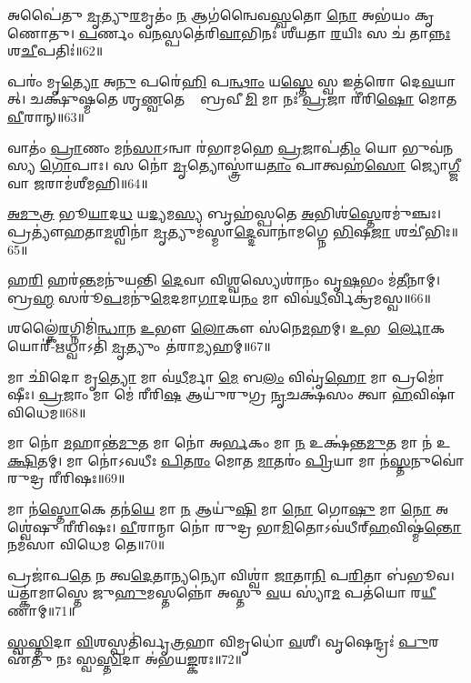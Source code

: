 
𑌅𑌪𑍈॑𑌤𑍁 \ul{𑌮𑍃}𑌤𑍍𑌯𑍁\ul{𑌰}𑌮𑍃𑌤𑌂॑ \ul{𑌨} 𑌆𑌗॑𑌨𑍍𑌵𑍈𑌵\ul{𑌸𑍍𑌵}𑌤𑍋 \ul{𑌨𑍋} 𑌅𑌭॑𑌯𑌂 𑌕𑍃𑌣𑍋𑌤𑍁। 
\ul{𑌪}𑌰𑍍𑌣𑌂 𑌵\ul{𑌨}𑌸𑍍𑌪𑌤𑍇॑𑌰𑌿\ul{𑌵𑌾}𑌭𑌿𑌨𑌃॑ 𑌶𑍀𑌯𑌤𑌾 \ul{𑌰}𑌯𑌿𑌃 𑌸 𑌚॑ 𑌤𑌾\ul{𑌨𑍍𑌨𑌃} 𑌶\ul{𑌚𑍀}𑌪𑌤𑌿𑌃॑॥62॥%
\anuvakamend

 𑌪𑌰𑌂॑ 𑌮𑍃\ul{𑌤𑍍𑌯𑍋} 𑌅\ul{𑌨𑍁} 𑌪𑌰𑍇॑\ul{𑌹𑌿} 𑌪\ul{𑌨𑍍𑌥𑌾𑌂} 𑌯\ul{𑌸𑍍𑌤𑍇} 𑌸𑍍𑌵 𑌇𑌤॑𑌰𑍋 𑌦𑍇\ul{𑌵}𑌯𑌾𑌨𑌾᳚𑌤𑍍। 
 𑌚𑌕𑍍𑌷𑍁॑𑌷𑍍𑌮𑌤𑍇 𑌶𑍃\ul{𑌣𑍍𑌵}𑌤𑍇 𑌤𑍇᳚ 𑌬𑍍𑌰𑌵𑍀\ul{𑌮𑌿} 𑌮𑌾 𑌨𑌃॑ \ul{𑌪𑍍𑌰}𑌜𑌾 𑌰𑍀॑𑌰𑌿\ul{𑌷𑍋} 𑌮𑍋𑌤 \ul{𑌵𑍀}𑌰𑌾𑌨𑍍॥63॥
 \anuvakamend
 
 𑌵𑌾𑌤𑌂॑ \ul{𑌪𑍍𑌰𑌾}𑌣𑌂 𑌮𑌨॑\ul{𑌸𑌾}𑌽𑌨𑍍𑌵𑌾 𑌰॑𑌭𑌾𑌮𑌹𑍇 \ul{𑌪𑍍𑌰}𑌜𑌾𑌪॑\ul{𑌤𑌿𑌂} 𑌯𑍋 𑌭𑍁𑌵॑𑌨𑌸𑍍𑌯 \ul{𑌗𑍋}𑌪𑌾𑌃। 
 𑌸 𑌨𑍋॑ \ul{𑌮𑍃}𑌤𑍍𑌯𑍋𑌸𑍍𑌤𑍍𑌰𑌾॑𑌯\ul{𑌤𑌾𑌂} 𑌪𑌾𑌤𑍍𑌵𑌹॑\ul{𑌸𑍋} 𑌜𑍍𑌯𑍋\ul{𑌗𑍍𑌜𑍀}𑌵𑌾 \ul{𑌜}𑌰𑌾𑌮॑𑌶𑍀𑌮𑌹𑌿॥64॥
 \anuvakamend
 
 \ul{𑌅}\ul{𑌮𑍁}\ul{𑌤𑍍𑌰} 𑌭𑍂\ul{𑌯𑌾}𑌦\ul{𑌧} 𑌯\ul{𑌦𑍍𑌯}𑌮\ul{𑌸𑍍𑌯} 𑌬𑍃𑌹॑𑌸𑍍𑌪𑌤𑍇 \ul{𑌅}𑌭𑌿𑌶॑\ul{𑌸𑍍𑌤𑍇}𑌰𑌮𑍁॑𑌞𑍍𑌚𑌃। 
 𑌪𑍍𑌰𑌤𑍍𑌯𑍗॑𑌹𑌤𑌾\ul{𑌮}𑌶𑍍𑌵𑌿𑌨𑌾॑ \ul{𑌮𑍃}𑌤𑍍𑌯𑍁𑌮॑𑌸𑍍𑌮𑌾\ul{𑌦𑍍𑌦𑍇}𑌵𑌾𑌨𑌾॑𑌮𑌗𑍍𑌨𑍇 \ul{𑌭𑌿}𑌷\ul{𑌜𑌾} 𑌶𑌚𑍀॑𑌭𑌿𑌃॥65॥
 \anuvakamend
 
 𑌹\ul{𑌰𑌿}\ul{} 𑌹𑌰॑\ul{𑌨𑍍𑌤}𑌮𑌨𑍁॑𑌯𑌨𑍍𑌤𑌿 \ul{𑌦𑍇}𑌵𑌾 𑌵𑌿\ul{𑌶𑍍𑌵}𑌸𑍍𑌯𑍇𑌶𑌾॑𑌨𑌂 𑌵𑍃\ul{𑌷}𑌭𑌂 𑌮॑\ul{𑌤𑍀}𑌨𑌾𑌮𑍍। 
 𑌬𑍍𑌰\ul{𑌹𑍍𑌮} 𑌸𑌰𑍂॑\ul{𑌪}𑌮𑌨𑍁॑\ul{𑌮𑍇}𑌦𑌮𑌾\ul{𑌗𑌾}𑌦𑌯॑\ul{𑌨𑌂} 𑌮𑌾 𑌵𑌿𑌵॑\ul{𑌧𑍀}𑌰𑍍𑌵𑌿𑌕𑍍𑌰॑𑌮𑌸𑍍𑌵॥66॥
 \anuvakamend
 
 𑌶𑌲𑍍𑌕𑍈॑\ul{𑌰}𑌗𑍍𑌨𑌿𑌮𑌿॑\ul{𑌨𑍍𑌧𑌾}𑌨 \ul{𑌉}𑌭𑍗 \ul{𑌲𑍋}𑌕𑍗 𑌸॑𑌨𑍇\ul{𑌮}𑌹𑌮𑍍। 
 \ul{𑌉}𑌭𑌯𑍋᳚\ul{𑌰𑍍𑌲𑍋}𑌕𑌯𑍋𑌰𑍍॑-\ul{𑌋}𑌧𑍍𑌵𑌾𑌽𑌤𑌿॑ \ul{𑌮𑍃}𑌤𑍍𑌯𑍁𑌂 𑌤॑𑌰𑌾\ul{𑌮𑍍𑌯}𑌹𑌮𑍍॥67॥
\anuvakamend
 
𑌮𑌾 𑌛𑌿॑𑌦𑍋 𑌮𑍃\ul{𑌤𑍍𑌯𑍋} 𑌮𑌾 𑌵॑\ul{𑌧𑍀}𑌰𑍍𑌮𑌾 \ul{𑌮𑍇} 𑌬\ul{𑌲𑌂} 𑌵𑌿𑌵𑍃॑\ul{𑌹𑍋} 𑌮𑌾 𑌪𑍍𑌰𑌮𑍋॑𑌷𑍀𑌃। 
\ul{𑌪𑍍𑌰}𑌜𑌾𑌂 𑌮𑌾 𑌮𑍇॑ 𑌰𑍀𑌰𑌿\ul{𑌷} 𑌆𑌯𑍁॑𑌰𑍁𑌗𑍍𑌰 \ul{𑌨𑍃}𑌚𑌕𑍍𑌷॑𑌸𑌂 𑌤𑍍𑌵𑌾 \ul{𑌹}𑌵𑌿𑌷𑌾॑ 𑌵𑌿𑌧𑍇𑌮॥68॥
\anuvakamend
 
𑌮𑌾 𑌨𑍋॑ \ul{𑌮}𑌹𑌾𑌨𑍍𑌤॑\ul{𑌮𑍁}𑌤 𑌮𑌾 𑌨𑍋॑ 𑌅\ul{𑌰𑍍𑌭}𑌕𑌂 𑌮𑌾 \ul{𑌨} 𑌉𑌕𑍍𑌷॑𑌨𑍍𑌤\ul{𑌮𑍁}𑌤 𑌮𑌾 𑌨॑ 𑌉\ul{𑌕𑍍𑌷𑌿}𑌤𑌮𑍍। 
𑌮𑌾 𑌨𑍋॑𑌽𑌵𑌧𑍀𑌃 \ul{𑌪𑌿}𑌤\ul{𑌰𑌂} 𑌮𑍋𑌤 \ul{𑌮𑌾}𑌤𑌰𑌂॑ \ul{𑌪𑍍𑌰𑌿}𑌯𑌾 𑌮𑌾 𑌨॑\ul{𑌸𑍍𑌤}𑌨𑍁𑌵𑍋॑ 𑌰𑍁𑌦𑍍𑌰 𑌰𑍀𑌰𑌿𑌷𑌃॥69॥
\anuvakamend

𑌮𑌾 𑌨॑\ul{𑌸𑍍𑌤𑍋}𑌕𑍇 𑌤𑌨॑\ul{𑌯𑍇} 𑌮𑌾 \ul{𑌨} 𑌆𑌯𑍁॑\ul{𑌷𑌿} 𑌮𑌾 \ul{𑌨𑍋} 𑌗𑍋\ul{𑌷𑍁} 𑌮𑌾 \ul{𑌨𑍋} 𑌅𑌶𑍍𑌵𑍇॑𑌷𑍁 𑌰𑍀𑌰𑌿𑌷𑌃। 
\ul{𑌵𑍀}𑌰𑌾𑌨𑍍𑌮𑌾 𑌨𑍋॑ 𑌰𑍁𑌦𑍍𑌰 𑌭𑌾\ul{𑌮𑌿}𑌤𑍋𑌽𑌵॑𑌧𑍀𑌰𑍍‌\ul{𑌹}𑌵𑌿𑌷𑍍𑌮॑\ul{𑌨𑍍𑌤𑍋} 𑌨𑌮॑𑌸𑌾 𑌵𑌿𑌧𑍇𑌮 𑌤𑍇॥70॥
\anuvakamend 

𑌪𑍍𑌰𑌜𑌾॑𑌪\ul{𑌤𑍇} 𑌨 𑌤𑍍𑌵\ul{𑌦𑍇}𑌤𑌾\ul{𑌨𑍍𑌯}𑌨𑍍𑌯𑍋 𑌵𑌿𑌶𑍍𑌵𑌾॑ \ul{𑌜𑌾}𑌤𑌾\ul{𑌨𑌿} 𑌪\ul{𑌰𑌿}𑌤𑌾 𑌬॑𑌭𑍂𑌵। 
𑌯𑌤𑍍𑌕𑌾॑𑌮𑌾𑌸𑍍𑌤𑍇 𑌜𑍁\ul{𑌹𑍁}𑌮𑌸𑍍𑌤𑌨𑍍𑌨𑍋॑ 𑌅𑌸𑍍𑌤𑍁 \ul{𑌵}𑌯 𑌸𑍍𑌯𑌾॑\ul{𑌮} 𑌪𑌤॑𑌯𑍋 𑌰\ul{𑌯𑍀}𑌣𑌾𑌮𑍍॥71॥
\anuvakamend 

\ul{𑌸𑍍𑌵}\ul{𑌸𑍍𑌤𑌿}𑌦𑌾 \ul{𑌵𑌿}𑌶𑌸𑍍𑌪𑌤𑌿॑𑌰𑍍𑌵𑍃\ul{𑌤𑍍𑌰}𑌹𑌾 𑌵𑌿𑌮𑍃𑌧𑍋॑ \ul{𑌵}𑌶𑍀। 
𑌵𑍃𑌷𑍇𑌨𑍍𑌦𑍍𑌰𑌃॑ \ul{𑌪𑍁}𑌰 𑌏॑𑌤𑍁 𑌨𑌃 𑌸𑍍𑌵\ul{𑌸𑍍𑌤𑌿}𑌦𑌾 𑌅॑𑌭𑌯\ul{𑌙𑍍𑌕}𑌰𑌃॥72॥
\anuvakamend 

